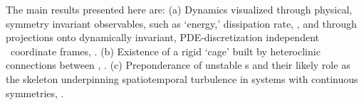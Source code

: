 The main results presented here are: (a) Dynamics visualized through
physical, symmetry invariant observables, such as `energy,'
dissipation rate, \etc,
and through
projections onto dynamically invariant, PDE-discretization
independent \statesp\ coordinate frames, . (b)
Existence of a rigid `cage' built by heteroclinic connections
between \eqva, . (c) Preponderance of
unstable \rpo s and their likely role as the skeleton underpinning
spatiotemporal turbulence in systems with continuous symmetries,
.
